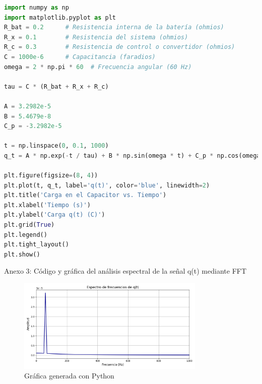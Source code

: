 \begin{lstlisting}[language=Python, caption={Código Python para simulación de carga}, label={cod:python}, frame=single, basicstyle=\footnotesize\ttfamily]
import numpy as np
import matplotlib.pyplot as plt
R_bat = 0.2      # Resistencia interna de la batería (ohmios)
R_x = 0.1        # Resistencia del sistema (ohmios)
R_c = 0.3        # Resistencia de control o convertidor (ohmios)
C = 1000e-6      # Capacitancia (faradios)
omega = 2 * np.pi * 60  # Frecuencia angular (60 Hz)

tau = C * (R_bat + R_x + R_c)

A = 3.2982e-5
B = 5.4679e-8
C_p = -3.2982e-5

t = np.linspace(0, 0.1, 1000)
q_t = A * np.exp(-t / tau) + B * np.sin(omega * t) + C_p * np.cos(omega * t)

plt.figure(figsize=(8, 4))
plt.plot(t, q_t, label='q(t)', color='blue', linewidth=2)
plt.title('Carga en el Capacitor vs. Tiempo')
plt.xlabel('Tiempo (s)')
plt.ylabel('Carga q(t) (C)')
plt.grid(True)
plt.legend()
plt.tight_layout()
plt.show()
\end{lstlisting}

\newpage
Anexo 3: Código y gráfica del análisis espectral de la señal q(t) mediante FFT

\begin{figure}[H]
	\centering
	\includegraphics[width=0.8\textwidth]{8.png}
	\caption{Gráfica generada con Python}
\end{figure}

